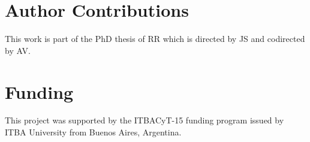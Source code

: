 \documentclass[utf8]{frontiersSCNS} %
\providecommand{\DIFaddbegin}{} %
\providecommand{\DIFaddend}{} %
\begin{document}
\section*{Author Contributions}

This work is part of the PhD thesis of RR which is directed by JS and codirected by AV.   

\section*{Funding}
This project was supported by the ITBACyT-15 funding program issued by ITBA University from Buenos Aires, Argentina.

\DIFaddbegin 

\DIFaddend  %





%
%
\end{document}
